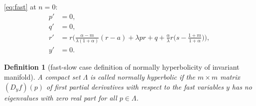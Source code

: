 \documentclass[a4paper,11pt]{article}
\newtheorem{theorem}{Theorem}
\newtheorem{definition}{Definition}[section]
\begin{document}
\eqref{eq:fast} at $n=0$:
\begin{equation} \label{eq:fast0}
 \begin{aligned}
 {p}' &=0,\\
 {q}' &=0,\\
 {r}' &=r\Big(\frac{\alpha-m}{\lambda(1+\alpha)}(r-a) + \lambda pr + q +\frac{\alpha}{\lambda}r\big(s- \frac{1+m}{1+\alpha}\big)\Big),\\
 {y}' &=0.
 \end{aligned}
\end{equation}

\begin{definition}[fast-slow case definition of normally hyperbolicity of invariant manifold]
A compact set $\Lambda$ is called normally hyperbolic if the $m\times m$ matrix $(D_y f)(p)$ of first partial derivatives with respect to the fast variables $y$ has no eigenvalues with zero real part for all $p \in \Lambda$.
\end{definition}
% 
% 
% 
\end{document}
